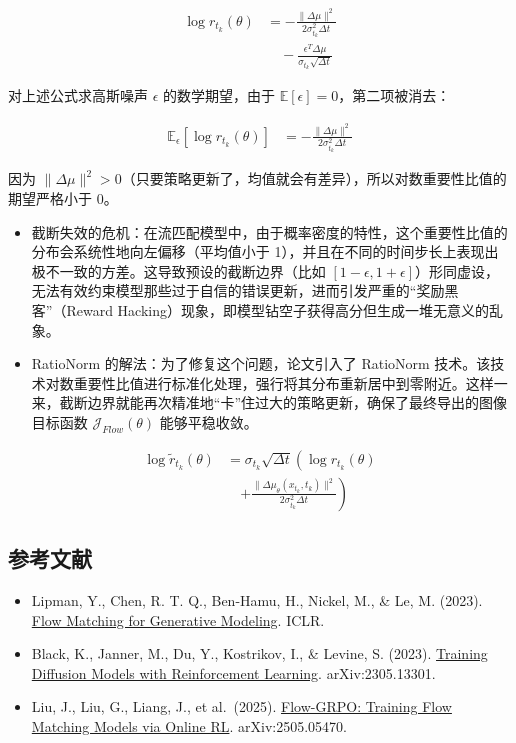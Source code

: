\[
\begin{aligned}
\log r_{t_k}(\theta)
&=
-\frac{\|\Delta\mu\|^2}{2\sigma_{t_k}^2\Delta t}
\\
&\quad-
\frac{\epsilon^T\Delta\mu}{\sigma_{t_k}\sqrt{\Delta t}}
\end{aligned}
\]

对上述公式求高斯噪声 \(\epsilon\) 的数学期望，由于 \(\mathbb{E}[\epsilon]=0\)，第二项被消去：

\[
\begin{aligned}
\mathbb{E}_{\epsilon}\left[\log r_{t_k}(\theta)\right]
&=
-\frac{\|\Delta\mu\|^2}{2\sigma_{t_k}^2\Delta t}
\end{aligned}
\]

因为 \(\|\Delta\mu\|^2>0\)（只要策略更新了，均值就会有差异），所以对数重要性比值的期望严格小于 0。

\begin{itemize}
\item
  截断失效的危机：在流匹配模型中，由于概率密度的特性，这个重要性比值的分布会系统性地向左偏移（平均值小于 1），并且在不同的时间步长上表现出极不一致的方差。这导致预设的截断边界（比如 \([1-\epsilon,1+\epsilon]\)）形同虚设，无法有效约束模型那些过于自信的错误更新，进而引发严重的``奖励黑客''（Reward Hacking）现象，即模型钻空子获得高分但生成一堆无意义的乱象。
\item
  RatioNorm 的解法：为了修复这个问题，论文引入了 RatioNorm 技术。该技术对数重要性比值进行标准化处理，强行将其分布重新居中到零附近。这样一来，截断边界就能再次精准地``卡''住过大的策略更新，确保了最终导出的图像目标函数 \(\mathcal{J}_{Flow}(\theta)\) 能够平稳收敛。
\end{itemize}

\[
\begin{aligned}
\log \tilde{r}_{t_k}(\theta)
&=
\sigma_{t_k}\sqrt{\Delta t}
\left(
\log r_{t_k}(\theta)
\right.
\\
&\quad\left.
+\frac{\|\Delta\mu_\theta(x_{t_k},t_k)\|^2}{2\sigma_{t_k}^2\Delta t}
\right)
\end{aligned}
\]

\hypertarget{ux53c2ux8003ux6587ux732e-137}{%
\subsection{参考文献}\label{ux53c2ux8003ux6587ux732e-137}}

\vspace{0.25em}
\begin{itemize}
\tightlist
\item
  Lipman, Y., Chen, R. T. Q., Ben-Hamu, H., Nickel, M., \& Le, M. (2023). \href{https://arxiv.org/abs/2210.02747}{Flow Matching for Generative Modeling}. ICLR.
\item
  Black, K., Janner, M., Du, Y., Kostrikov, I., \& Levine, S. (2023). \href{https://arxiv.org/abs/2305.13301}{Training Diffusion Models with Reinforcement Learning}. arXiv:2305.13301.
\item
  Liu, J., Liu, G., Liang, J., et al.~(2025). \href{https://arxiv.org/abs/2505.05470}{Flow-GRPO: Training Flow Matching Models via Online RL}. arXiv:2505.05470.
\end{itemize}

\clearpage
